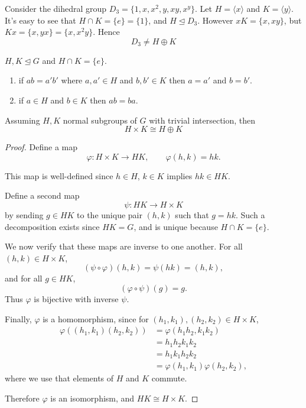 \begin{ex}
    Consider the dihedral group $D_3 = \{1,x,x^2, y, xy, x^y\}$. 
    Let $H = \langle x \rangle$ and $K = \langle y \rangle$.
    It's easy to see that 
    $H \cap K = \{e\} = \{1\}$, and $H \unlhd D_3$. 
    However $xK = \{x, xy\}$, but $Kx = \{x,yx\} = \{x, x^2y\}$. 
    Hence 
    \[
        D_3 \neq H \oplus K
    \]
\end{ex}

\begin{lem}
    $H,K \unlhd G$ and $H \cap K = \{e\}$. 
    \begin{enumerate}
        \item if $ab = a'b'$ where $a,a' \in H$ and $b,b' \in K$ 
            then $a = a'$ and $b = b'$.
        \item if $a \in H$ and $b \in K $ then $ab = ba$.
    \end{enumerate}
\end{lem}

\begin{thm}
    Assuming $H,K$ normal subgroups of $G$ with trivial intersection, 
    then 
    \[
        H \times K \cong H \oplus K
    \]
\end{thm}
\begin{proof}
Define a map
\[
\varphi : H \times K \to HK, \qquad \varphi(h,k) = hk.
\]

This map is well-defined since \(h \in H\), \(k \in K\) implies \(hk \in HK\).

Define a second map
\[
\psi : HK \to H \times K
\]
by sending \(g \in HK\) to the unique pair \((h,k)\) such that \(g = hk\).
Such a decomposition exists since \(HK = G\), and is unique because
\(H \cap K = \{e\}\).

We now verify that these maps are inverse to one another. For all
\((h,k) \in H \times K\),
\[
(\psi \circ \varphi)(h,k) = \psi(hk) = (h,k),
\]
and for all \(g \in HK\),
\[
(\varphi \circ \psi)(g) = g.
\]
Thus \(\varphi\) is bijective with inverse \(\psi\).

Finally, \(\varphi\) is a homomorphism, since for \((h_1,k_1),(h_2,k_2) \in H \times K\),
\begin{align*}
    \varphi((h_1,k_1)(h_2,k_2))
    &= \varphi(h_1h_2,k_1k_2) \\
    &= h_1h_2k_1k_2 \\
    &= h_1k_1h_2k_2 \\
    &= \varphi(h_1,k_1)\varphi(h_2,k_2),
\end{align*}
where we use that elements of \(H\) and \(K\) commute.

Therefore \(\varphi\) is an isomorphism, and \(HK \cong H \times K\).
\end{proof}

